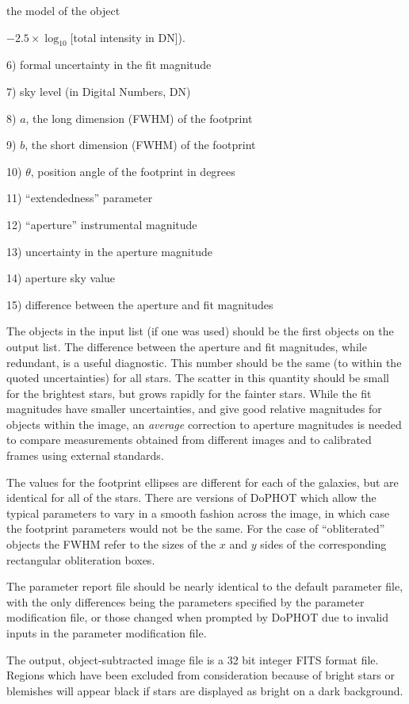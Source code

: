 the model of the object {$-2.5 \times \log_{10}$[total intensity in DN]).
\item{6)} formal uncertainty in the fit magnitude
\item{7)}  sky level (in Digital Numbers, DN)
\item{8)}  $a$, the long dimension (FWHM) of the footprint
\item{9)}  $b$, the short dimension (FWHM) of the footprint
\item{10)}  $\theta$, position angle of the footprint in degrees
\item{11)} ``extendedness'' parameter
\item{12)} ``aperture'' instrumental magnitude
\item{13)} uncertainty in the aperture magnitude
\item{14)} aperture sky value
\item{15)} difference between the aperture and fit magnitudes

The objects in the input list (if one was used) 
should be the first objects on
the output list.  The difference between the aperture and
fit magnitudes, while redundant, is a useful diagnostic.
This number should be the same (to within the quoted
uncertainties) for all stars.  The scatter in this quantity
should be small for the brightest stars, but grows rapidly
for the fainter stars.  While the fit magnitudes have
smaller uncertainties, and give good relative magnitudes for
objects within the image, an {\it average} correction to
aperture magnitudes is needed to compare measurements
obtained from different images and to calibrated frames using
external standards.

The values for the footprint ellipses are different for each
of the galaxies, but are identical for all of the stars.
There are versions of DoPHOT which allow the typical
parameters to vary in a smooth fashion across the image, in
which case the footprint parameters would not be the same.
For the case of ``obliterated'' objects the FWHM refer to the sizes
of the $x$ and $y$ sides of the corresponding rectangular 
obliteration boxes.

The parameter report file should be nearly identical to
the default parameter file, with the only differences
being the parameters specified by the parameter modification
file, or those changed when prompted by DoPHOT due to
invalid inputs in the parameter modification file.

The output, object-subtracted image file is a 32 bit integer FITS
format file.  Regions which have been
excluded from consideration because of bright stars or
blemishes will appear black if stars are displayed as bright
on a dark background.

}
